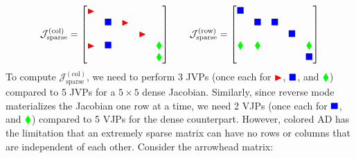 \begin{equation}
    \mathcal{J}^{(\text{col})}_{\text{sparse}} = \begin{bmatrix}
        \color{red}{\blacktriangleright} &                            &                                  &                                  &                              \\
                                         & \color{blue}{\blacksquare} & \color{red}{\blacktriangleright} &                                  &                              \\
                                         &                            &                                  & \color{red}{\blacktriangleright} &                              \\
        \color{red}{\blacktriangleright} & \color{blue}{\blacksquare} &                                  &                                  & \color{green}{\blacklozenge} \\
                                         &                            &                                  &                                  & \color{green}{\blacklozenge}
    \end{bmatrix} \qquad \mathcal{J}^{(\text{row})}_{\text{sparse}} = \begin{bmatrix}
        \color{blue}{\blacksquare}   &                              &                            &                            &                              \\
                                     & \color{blue}{\blacksquare}   & \color{blue}{\blacksquare} &                            &                              \\
                                     &                              &                            & \color{blue}{\blacksquare} &                              \\
        \color{green}{\blacklozenge} & \color{green}{\blacklozenge} &                            &                            & \color{green}{\blacklozenge} \\
                                     &                              &                            &                            & \color{blue}{\blacksquare}
    \end{bmatrix}
\end{equation}
%
To compute $\mathcal{J}^{(\text{col})}_{\text{sparse}}$, we need to perform 3 JVPs (once each for $\color{red}{\blacktriangleright}$, $\color{blue}{\blacksquare}$, and $\color{green}{\blacklozenge}$) compared to 5 JVPs for a $5 \times 5$ dense Jacobian. Similarly, since reverse mode materializes the Jacobian one row at a time, we need 2 VJPs (once each for $\color{blue}{\blacksquare}$, and $\color{green}{\blacklozenge}$) compared to 5 VJPs for the dense counterpart. However, colored AD has the limitation that an extremely sparse matrix can have no rows or columns that are independent of each other. Consider the arrowhead matrix:
